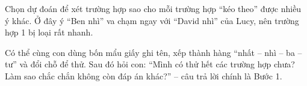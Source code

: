 {\begin{center}
\begin{tabular}{|l|c|c|}
\end{tabular}
\end{center}
\begin{tipbox}Chọn dự đoán để xét trường hợp sao cho mỗi trường hợp ``kéo theo'' được nhiều ý khác. Ở đây ý ``Ben nhì'' va chạm ngay với
``David nhì'' của Lucy, nên trường hợp 1 bị loại rất nhanh.\end{tipbox}
\begin{parentbox}Có thể cùng con dùng bốn mẩu giấy ghi tên, xếp thành hàng ``nhất -- nhì -- ba -- tư'' và đổi chỗ để thử. Sau đó hỏi con:
``Mình có thử hết các trường hợp chưa? Làm sao chắc chắn không còn đáp án khác?'' -- câu trả lời chính là Bước 1.\end{parentbox}
}
